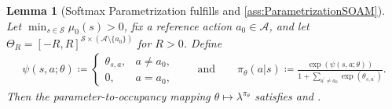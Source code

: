 \documentclass{article}
\theoremstyle{plain}
\newtheorem{lemma}[theorem]{Lemma}
\theoremstyle{definition}
\theoremstyle{remark}
\def\SS{{\mathcal{S}}}
\def\AA{{\mathcal{A}}}
\newcommand{\define}{\coloneqq}
\def\ss{{s}}
\def\aa{{a}}
\def\ss{{s}}
\begin{document}
\begin{lemma}[Softmax Parametrization fulfills
   and \ref{ass:ParametrizationSOAM}]
 \label{lem:AnchoredSoftmaxFulfillsAssumptions}
 Let $\min_{\ss\in\SS}\mu_0(\ss)>0$, fix a reference action
 $\aa_0\in\AA$, and let
 $\Theta_R=[-R,R]^{\SS\times(\AA\setminus\{\aa_0\})}$ for $R>0$. Define
 \begin{align*}
  \psi(\ss,\aa;\theta)\define
  \begin{cases}
   \theta_{\ss,\aa}, & \aa\neq\aa_0, \\
   0,                & \aa=\aa_0,
  \end{cases}
  \qquad \textrm{and}\qquad
  \pi_\theta(\aa\vert\ss)
  \define \frac{\exp(\psi(\ss,\aa;\theta))}
  {1+\sum_{\aa^\prime\neq\aa_0}\exp(\theta_{\ss,\aa^\prime})}.
 \end{align*}
 Then the parameter-to-occupancy mapping
 $\theta\mapsto\lambda^{\pi_\theta}$ satisfies
  and .
\end{lemma}
\end{document}
